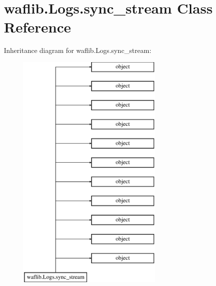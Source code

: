 \hypertarget{classwaflib_1_1_logs_1_1sync__stream}{}\section{waflib.\+Logs.\+sync\+\_\+stream Class Reference}
\label{classwaflib_1_1_logs_1_1sync__stream}
Inheritance diagram for waflib.\+Logs.\+sync\+\_\+stream\+:\begin{figure}[H]
\begin{center}
\leavevmode
\includegraphics[height=12.000000cm]{classwaflib_1_1_logs_1_1sync__stream}
\end{center}
\end{figure}
